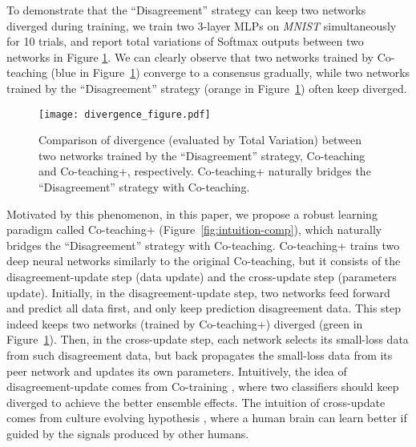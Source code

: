 \documentclass{article}
\begin{document}
To demonstrate that the ``Disagreement'' strategy can keep two networks diverged during training, we train two 3-layer MLPs \cite{goodfellow2016deep} on \textit{MNIST} simultaneously for 10 trials, and report total variations of Softmax outputs between two networks in Figure \ref{fig:intuition-divergence}. We can clearly observe that two networks trained by Co-teaching (blue in Figure~\ref{fig:intuition-divergence}) converge to a consensus gradually, while two networks trained by the ``Disagreement'' strategy (orange in Figure~\ref{fig:intuition-divergence}) often keep diverged.

\begin{figure}[!tp]
\centering
\texttt{[image: divergence\_figure.pdf]}
\caption{Comparison of divergence (evaluated by Total Variation) between two networks trained by the ``Disagreement'' strategy, Co-teaching and Co-teaching+, respectively. Co-teaching+ naturally bridges the ``Disagreement'' strategy with Co-teaching.}
\label{fig:intuition-divergence}
\end{figure}

Motivated by this phenomenon, in this paper, we propose a robust learning paradigm called Co-teaching+ (Figure~\ref{fig:intuition-comp}), which naturally bridges the ``Disagreement'' strategy with Co-teaching. Co-teaching+ trains two deep neural networks similarly to the original Co-teaching, but it consists of the disagreement-update step (data update) and the cross-update step (parameters update). Initially, in the disagreement-update step, two networks feed forward and predict all data first, and only keep prediction disagreement data. This step indeed keeps two networks (trained by Co-teaching+) diverged (green in Figure~\ref{fig:intuition-divergence}). Then, in the cross-update step, each network selects its small-loss data from such disagreement data, but back propagates the small-loss data from its peer network and updates its own parameters. Intuitively, the idea of disagreement-update comes from Co-training \cite{blum1998combining}, where two classifiers should keep diverged to achieve the better ensemble effects. The intuition of cross-update comes from culture evolving hypothesis \cite{bengio2014evolving}, where a human brain can learn better if guided by the signals produced by other humans.
\end{document}
